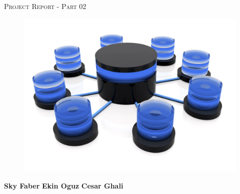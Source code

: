 \documentclass[a4paper,12pt]{article}
\begin{document}
\begin{titlepage}
\vspace{1.5cm}

\begin{center}
\begin{LARGE}
\textsc{Project Report - Part 02}
\end{LARGE}
\end{center}

\vspace{2.5cm}

\begin{figure}[h]
\centering
\includegraphics[scale=1]{Figures/database.png}
\end{figure}

\vspace{2.5cm}

\begin{center}
\begin{Large}
\textbf{Sky Faber} \quad\quad \textbf{Ekin Oguz} \quad\quad \textbf{Cesar Ghali}
\end{Large}
\end{center}
\end{titlepage}


\setcounter{page}{1}


\setcounter{tocdepth}{3}






\newpage



\pagestyle{fancy}
\setcounter{page}{1}
\end{document}
